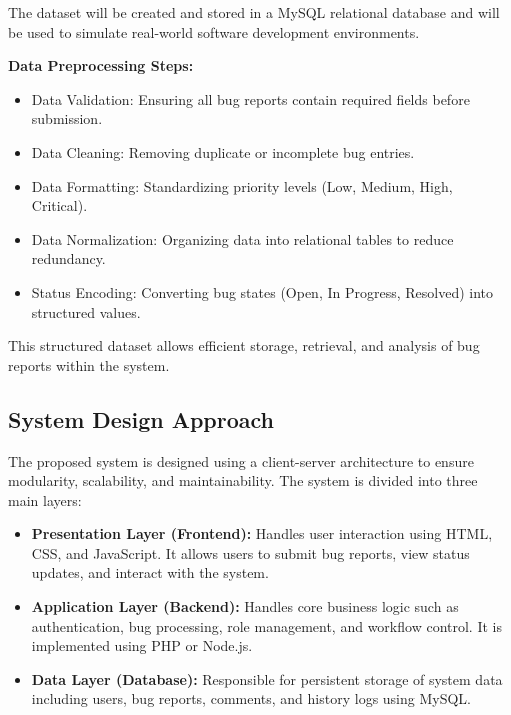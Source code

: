 \documentclass[12pt]{article}
\begin{document}
The dataset will be created and stored in a MySQL relational database and will be used to simulate real-world software development environments.

\textbf{Data Preprocessing Steps:}
\begin{itemize}
    \item Data Validation: Ensuring all bug reports contain required fields before submission.
    \item Data Cleaning: Removing duplicate or incomplete bug entries.
    \item Data Formatting: Standardizing priority levels (Low, Medium, High, Critical).
    \item Data Normalization: Organizing data into relational tables to reduce redundancy.
    \item Status Encoding: Converting bug states (Open, In Progress, Resolved) into structured values.
\end{itemize}

This structured dataset allows efficient storage, retrieval, and analysis of bug reports within the system.
\subsection{System Design Approach}

The proposed system is designed using a client-server architecture to ensure modularity, scalability, and maintainability. The system is divided into three main layers:

\begin{itemize}
    \item \textbf{Presentation Layer (Frontend):} Handles user interaction using HTML, CSS, and JavaScript. It allows users to submit bug reports, view status updates, and interact with the system.

    \item \textbf{Application Layer (Backend):} Handles core business logic such as authentication, bug processing, role management, and workflow control. It is implemented using PHP or Node.js.

    \item \textbf{Data Layer (Database):} Responsible for persistent storage of system data including users, bug reports, comments, and history logs using MySQL.
\end{itemize}

\vspace{0.5cm}
\end{document}
